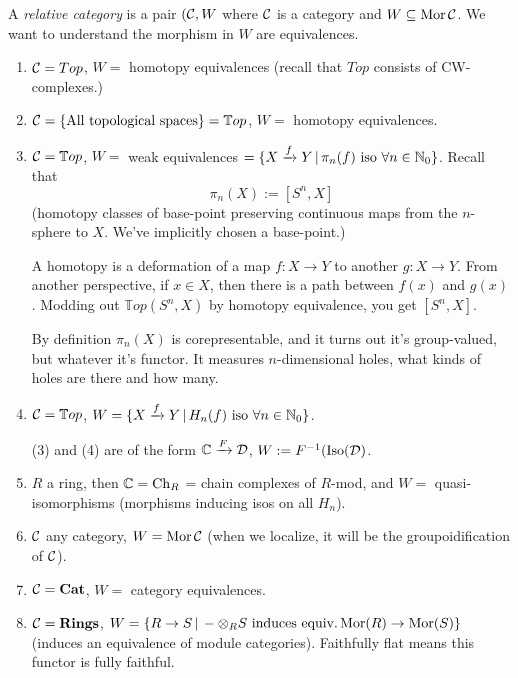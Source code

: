\documentclass[../MH_Total.tex]{subfiles}
\begin{document}
\begin{definition}
	A \emph{relative category} is a pair $(\mathcal{C}, W$ where $\mathcal{C}$ is a category and $W \subseteq \operatorname{Mor}\mathcal{C}$. We want to understand the morphism in $W$ are equivalences.
\end{definition}
	\begin{example}
		\begin{enumerate}
			\item $\mathcal{C} = Top$, $W =$ homotopy equivalences (recall that $Top$ consists of CW-complexes.)

			\item $\mathcal{C} = \{\text{All topological spaces}\} = \mathbb{T}op$, $W =$ homotopy equivalences. 
			\item $\mathcal{C} = \mathbb{T}op$, $W =$ weak equivalences $ = \{X \xrightarrow{f} Y \,|\, \pi_n(f) \text{ iso }\forall n \in \mathbb{N}_0\}$. Recall that
			\[
			\pi_n(X) := [S^n,X]
			\]
			(homotopy classes of base-point preserving continuous maps from the $n$-sphere to $X$. We've implicitly chosen a base-point.)

			A homotopy is a deformation of a map $f: X \to Y$ to another $g: X \to Y$. From another perspective, if $x \in X$, then there is a path between $f(x)$ and $g(x)$. Modding out $\mathbb{T}op(S^n,X)$ by homotopy equivalence, you get $[S^n,X]$. 

			By definition $\pi_n(X)$ is corepresentable, and it turns out it's group-valued, but whatever it's functor. It measures $n$-dimensional holes, what kinds of holes are there and how many.

			\item $\mathcal{C} = \mathbb{T}op$, $W = \{X \xrightarrow{f} Y \,|\, H_n(f) \text{ iso }\forall n \in \mathbb{N}_0\}$. 

			(3) and (4) are of the form $\mathbb{C} \xrightarrow{F} \mathcal{D}$, $W := F^{-1}(\operatorname{Iso}(\mathcal{D})$.

			\item $R$ a ring, then $\mathbb{C} = \operatorname{Ch}_R$ = chain complexes of $R$-mod, and $W = $ quasi-isomorphisms (morphisms inducing isos on all $H_n$).

			\item $\mathcal{C}$ any category, $W = \operatorname{Mor}\mathcal{C}$ (when we localize, it will be the groupoidification of $\mathcal{C}$). 

			\item $\mathcal{C} = \mathbf{Cat}$, $W = $ category equivalences. 

			\item $\mathcal{C} = \mathbf{Rings}$, $W = \{R \to S \,|\, - \otimes_R S \text{ induces equiv.} \operatorname{Mor}(R) \to \operatorname{Mor}(S)\}$ (induces an equivalence of module categories). Faithfully flat means this functor is fully faithful. 
		\end{enumerate}
	\end{example}
\end{document}
